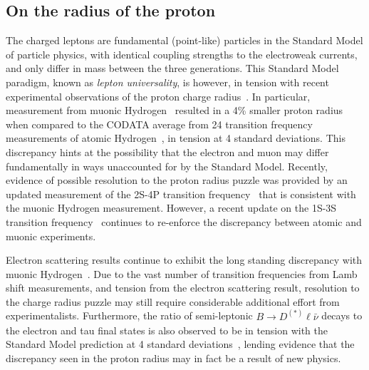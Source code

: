 \documentclass[prd,aps,twocolumn,superscriptaddress,tightenlines,nofootinbib,floatfix,preprintnumbers,10pt]{revtex4-1}
\begin{document}
\subsection{On the radius of the proton}
The charged leptons are fundamental (point-like) particles in the
Standard Model of particle physics, with identical coupling strengths
to the electroweak currents, and only differ in mass between the three
generations. This Standard Model paradigm, known as \textit{lepton
  universality}, is however, in tension with recent experimental
observations of the proton charge radius~\cite{Carlson:2015jba}. In
particular, measurement from muonic Hydrogen~\cite{nature09250}
resulted in a 4\% smaller proton radius when compared to the CODATA
average from 24 transition frequency measurements of atomic
Hydrogen~\cite{RevModPhys.80.633}, in tension at 4 standard
deviations. This discrepancy hints at the possibility that the
electron and muon may differ fundamentally in ways unaccounted for by
the Standard Model. Recently, evidence of possible resolution to the
proton radius puzzle was provided by an updated measurement of the
2S-4P transition frequency~\cite{Beyer79} that is consistent with the
muonic Hydrogen measurement. However, a recent update on the 1S-3S
transition frequency~\cite{fleurbaey:tel-01633631} continues to
re-enforce the discrepancy between atomic and muonic
experiments.

Electron scattering results continue to exhibit the long standing
discrepancy with muonic Hydrogen~\cite{Sick:2018fzn}. Due to the vast
number of transition frequencies from Lamb shift measurements, and
tension from the electron scattering result, resolution to the charge
radius puzzle may still require considerable additional effort from
experimentalists. Furthermore, the ratio of semi-leptonic
$B\rightarrow D^{(*)}\ell\bar{\nu}$ decays to the electron and tau
final states is also observed to be in tension with the Standard Model
prediction at 4 standard deviations~\cite{Ciezarek:2017yzh}, lending
evidence that the discrepancy seen in the proton radius may in fact be
a result of new physics.
\end{document}
